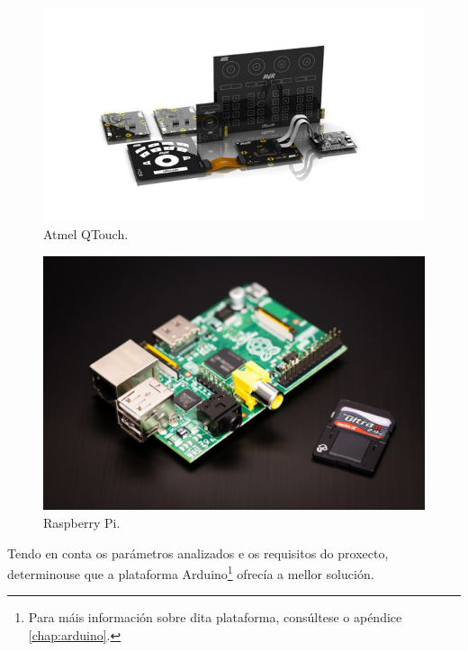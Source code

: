   \begin{figure}[htbp]
   \centering
   \includegraphics[scale=0.7,keepaspectratio=true]{./imagenes/qtouch.jpg}
   \caption{Atmel QTouch.}
   \label{figura:QTouch}
  \end{figure}

  \begin{figure}[htbp]
   \centering
   \includegraphics[scale=0.2,keepaspectratio=true]{./imagenes/raspberrypi.jpg}
   \caption{Raspberry Pi.}
   \label{figura:RaspberryPi}
  \end{figure}

  Tendo en conta os parámetros analizados e os requisitos do proxecto,
  determinouse que a plataforma Arduino\footnote{Para máis información sobre
  dita plataforma, consúltese o apéndice \ref{chap:arduino}.} ofrecía a mellor
  solución. \\

